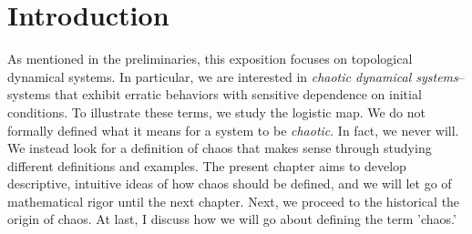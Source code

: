 \documentclass[12pt,twoside]{book}
\begin{document}
\chapter{Introduction}
\label{chap:intro}
As mentioned in the preliminaries, this exposition focuses on topological dynamical systems.
In particular, we are interested in \textit{chaotic dynamical systems}--systems that exhibit erratic behaviors with sensitive dependence on initial conditions.
To illustrate these terms, we study the logistic map.
We do not formally defined what it means for a system to be \textit{chaotic}.
In fact, we never will.
We instead look for a definition of chaos that makes sense through studying different definitions and examples.
The present chapter aims to develop descriptive, intuitive ideas of how chaos should be defined, and we will let go of mathematical rigor until the next chapter.
Next, we proceed to the historical the origin of chaos.
At last, I discuss how we will go about defining the term 'chaos.'

\end{document}

